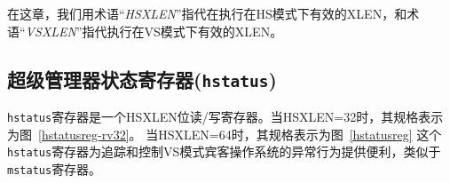 在这章，我们用术语“{\em HSXLEN}”指代在执行在HS模式下有效的XLEN，和术语“{\em VSXLEN}”指代执行在VS模式下有效的XLEN。

\subsection{超级管理器状态寄存器({\tt hstatus})}

{\tt hstatus}寄存器是一个HSXLEN位读/写寄存器。当HSXLEN=32时，其规格表示为图~\ref{hstatusreg-rv32}。
当HSXLEN=64时，其规格表示为图~\ref{hstatusreg}
这个{\tt hstatus}寄存器为追踪和控制VS模式宾客操作系统的异常行为提供便利，类似于{\tt mstatus}寄存器。

\begin{figure*}[h!]
{\footnotesize
\begin{center}
\setlength{\tabcolsep}{4pt}
\end{center}
}
\vspace{-0.1in}
\caption{当HSXLEN=32时， 超级监管器状态寄存器（{\tt hstatus}）。 Hypervisor status register ({\tt hstatus}) when HSXLEN=32.}
\label{hstatusreg-rv32}
\end{figure*}

